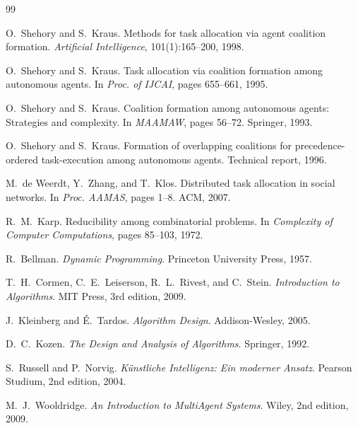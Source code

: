 \documentclass[a4paper,12pt]{article}
\theoremstyle{definition}
\begin{document}
\begin{thebibliography}{99}

O.\ Shehory and S.\ Kraus.
\newblock Methods for task allocation via agent coalition formation.
\newblock \textit{Artificial Intelligence}, 101(1):165--200, 1998.

O.\ Shehory and S.\ Kraus.
\newblock Task allocation via coalition formation among autonomous agents.
\newblock In \textit{Proc. of IJCAI}, pages 655--661, 1995.

O.\ Shehory and S.\ Kraus.
\newblock Coalition formation among autonomous agents: Strategies and complexity.
\newblock In \textit{MAAMAW}, pages 56--72. Springer, 1993.

O.\ Shehory and S.\ Kraus.
\newblock Formation of overlapping coalitions for precedence-ordered
         task-execution among autonomous agents.
\newblock Technical report, 1996.

M.\ de Weerdt, Y.\ Zhang, and T.\ Klos.
\newblock Distributed task allocation in social networks.
\newblock In \textit{Proc. AAMAS}, pages 1--8. ACM, 2007.

R.\ M.\ Karp.
\newblock Reducibility among combinatorial problems.
\newblock In \textit{Complexity of Computer Computations}, pages 85--103, 1972.

R.\ Bellman.
\newblock \textit{Dynamic Programming}.
\newblock Princeton University Press, 1957.

T.\ H.\ Cormen, C.\ E.\ Leiserson, R.\ L.\ Rivest, and C.\ Stein.
\newblock \textit{Introduction to Algorithms}.
\newblock MIT Press, 3rd edition, 2009.

J.\ Kleinberg and \'{E}.\ Tardos.
\newblock \textit{Algorithm Design}.
\newblock Addison-Wesley, 2005.

D.\ C.\ Kozen.
\newblock \textit{The Design and Analysis of Algorithms}.
\newblock Springer, 1992.

S.\ Russell and P.\ Norvig.
\newblock \textit{K\"{u}nstliche Intelligenz: Ein moderner Ansatz}.
\newblock Pearson Studium, 2nd edition, 2004.

M.\ J.\ Wooldridge.
\newblock \textit{An Introduction to MultiAgent Systems}.
\newblock Wiley, 2nd edition, 2009.


\end{thebibliography}
\end{document}
